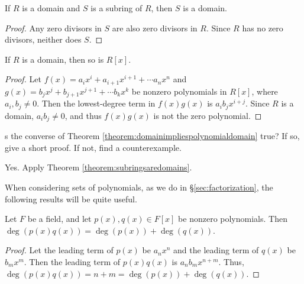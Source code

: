 \documentclass[english,course]{lecture}
\theoremstyle{plain}
\newenvironment{question}[1]
  {\renewcommand\theinnerquestion{#1}\innerquestion}
  {\endinnerquestion}
\def\presnotes{}
\begin{document}
\presnotes

\begin{theorem}\label{theorem:subringsaredomains}
	If $R$ is a domain and $S$ is a subring of $R$, then $S$ is a domain.
\end{theorem}

\begin{proof}
	Any zero divisors in $S$ are also zero divisors in $R$.
	Since $R$ has no zero divisors, neither does $S$.
\end{proof}

\presnotes


\begin{theorem}\label{theorem:domainimpliespolynomialdomain}
	If $R$ is a domain, then so is $R[x]$.
\end{theorem}

\begin{proof}
	Let $f(x) = a_i x^i + a_{i+1} x^{i+1} + \cdots a_n x^n$ and $g(x) = b_j x^j + b_{j+1} x^{j+1} +  \cdots b_k x^k$ be nonzero polynomials in $R[x]$, where $a_i, b_j \ne 0$.
	Then the lowest-degree term in $f(x) g(x)$ is $a_i b_j x^{i+j}$.
	Since $R$ is a domain, $a_i b_j\ne 0$, and thus $f(x)g(x)$ is not the zero polynomial.
\end{proof}

\presnotes


\begin{question}
	Is the converse of Theorem \ref{theorem:domainimpliespolynomialdomain} true? If so, give a short proof. If not, find a counterexample.
\end{question}

\begin{answer}
	Yes. Apply Theorem \ref{theorem:subringsaredomains}.
\end{answer}

\presnotes

When considering sets of polynomials, as we do in \S \ref{sec:factorization}, the following results will be quite useful.

\begin{theorem}\label{theorem:degreeofproductinfield}
	Let $F$ be a field, and let $p(x),q(x)\in F[x]$ be nonzero polynomials.
	Then $\deg(p(x) q(x)) = \deg(p(x)) + \deg(q(x))$.
\end{theorem}

\begin{proof}
	Let the leading term of $p(x)$ be $a_n x^n$ and the leading term of $q(x)$ be $b_m x^m$.
	Then the leading term of $p(x) q(x)$ is $a_n b_m x^{n+m}$.
	Thus, $\deg(p(x) q(x)) = n+m = \deg(p(x)) + \deg(q(x))$.
\end{proof}
\end{document}

